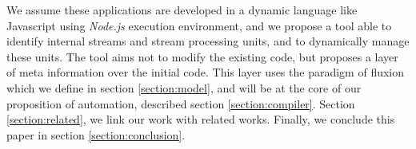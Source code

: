 We assume these applications are developed in a dynamic language like Javascript using \textit{Node.js} execution environment, and we propose a tool able to identify internal streams and stream processing units, and to dynamically manage these units.
The tool aims not to modify the existing code, but proposes a layer of meta information over the initial code.
This layer uses the paradigm of fluxion which we define in section \ref{section:model}, and will be at the core of our proposition of automation, described section \ref{section:compiler}.
Section \ref{section:related}, we link our work with related works.
Finally, we conclude this paper in section \ref{section:conclusion}.